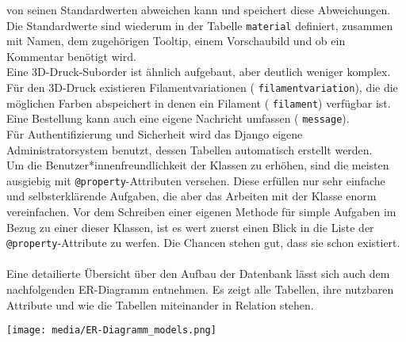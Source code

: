 \documentclass[12pt]{article}
\newcommand{\class}[1]{{\color{teal} \texttt{#1}}}
\newcommand{\property}[1]{{\color{purple} \texttt{#1}}}
\begin{document}
von seinen Standardwerten abweichen kann und speichert diese Abweichungen. Die Standardwerte sind wiederum in der Tabelle \class{material} definiert, zusammen mit Namen, dem zugehörigen Tooltip, einem  Vorschaubild und ob ein Kommentar
benötigt wird.
\\
Eine 3D-Druck-Suborder ist ähnlich aufgebaut, aber deutlich weniger komplex. Für den 3D-Druck existieren Filamentvariationen (\class{filamentvariation}), die die möglichen Farben abspeichert in denen ein Filament (\class{filament}) 
verfügbar ist. 
\\
Eine Bestellung kann auch eine eigene Nachricht umfassen (\class{message}).
\\ 
Für Authentifizierung und Sicherheit wird das Django eigene Administratorsystem benutzt, dessen Tabellen automatisch erstellt werden.
\\
Um die Benutzer*innenfreundlichkeit der Klassen zu erhöhen, sind die meisten ausgiebig mit \property{@property}-Attributen versehen. Diese erfüllen nur sehr einfache und selbsterklärende Aufgaben, die aber das Arbeiten mit der Klasse enorm vereinfachen.
Vor dem Schreiben einer eigenen Methode für simple Aufgaben im Bezug zu einer dieser Klassen, ist es wert zuerst einen Blick in die Liste der \property{@property}-Attribute zu werfen. Die Chancen stehen gut, dass sie schon existiert.
\\ \\
Eine detailierte Übersicht über den Aufbau der Datenbank lässt sich auch dem nachfolgenden ER-Diagramm entnehmen. Es zeigt alle Tabellen, ihre nutzbaren Attribute und wie die Tabellen miteinander in Relation stehen.


\texttt{[image: media/ER-Diagramm\_models.png]}
\end{document}
